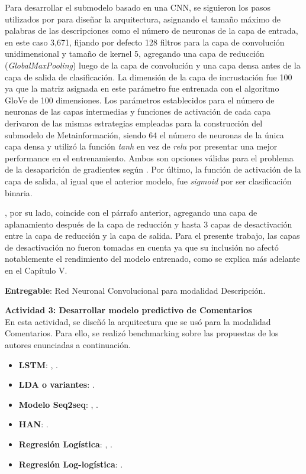 Para desarrollar el submodelo basado en una CNN, se siguieron los pasos utilizados por \cite{tec_malik2019pythonnlp} para diseñar la arquitectura, asignando el tamaño máximo de palabras de las descripciones como el número de neuronas de la capa de entrada, en este caso 3,671, fijando por defecto 128 filtros para la capa de convolución unidimensional y tamaño de kernel 5, agregando una capa de reducción (\textit{GlobalMaxPooling}) luego de la capa de convolución y una capa densa antes de la capa de salida de clasificación. La dimensión de la capa de incrustación fue 100 ya que la matriz asignada en este parámetro fue entrenada con el algoritmo GloVe de 100 dimensiones. Los parámetros establecidos para el número de neuronas de las capas intermedias y funciones de activación de cada capa derivaron de las mismas estrategias empleadas para la construcción del submodelo de Metainformación, siendo 64 el número de neuronas de la única capa densa y utilizó la función \textit{tanh} en vez de \textit{relu} por presentar una mejor performance en el entrenamiento. Ambos son opciones válidas para el problema de la desaparición de gradientes según \cite{tec_brownlee2019vanishing_gradients}. Por último, la función de activación de la capa de salida, al igual que el anterior modelo, fue \textit{sigmoid} por ser clasificación binaria.

\cite{tec_ardi2020conv1d}, por su lado, coincide con el párrafo anterior, agregando una capa de aplanamiento después de la capa de reducción y hasta 3 capas de desactivación entre la capa de reducción y la capa de salida. Para el presente trabajo, las capas de desactivación no fueron tomadas en cuenta ya que su inclusión no afectó notablemente el rendimiento del modelo entrenado, como se explica más adelante en el Capítulo V.

\textbf{Entregable}: Red Neuronal Convolucional para modalidad Descripción.

\vspace{0.3cm}
\textbf{Actividad 3: Desarrollar modelo predictivo de Comentarios}
\\
En esta actividad, se diseñó la arquitectura que se usó para la modalidad Comentarios. Para ello, se realizó benchmarking sobre las propuestas de los autores enunciadas a continuación.

\begin{itemize}
	\item \textbf{LSTM}: \cite{pr_jin2019dayssuccess}, \cite{pr_shafqat2019topicpredictions}.
	\item \textbf{LDA o variantes}: \cite{pr_shafqat2019topicpredictions}.
	\item \textbf{Modelo Seq2seq}: \cite{pr_lee2018contentDL}, \cite{pr_jin2019dayssuccess}.
	\item \textbf{HAN}: \cite{pr_lee2018contentDL}.
	\item \textbf{Regresión Logística}: \cite{pr_li2016predcrowd}, \cite{pr_kaur2017socmedcrowd}.
	\item \textbf{Regresión Log-logística}: \cite{pr_li2016predcrowd}.
\end{itemize}

